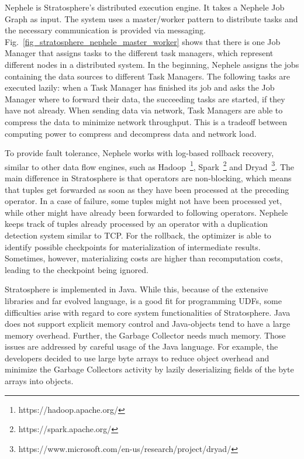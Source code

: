 Nephele is Stratosphere's distributed execution engine. It takes a Nephele Job Graph as input. The system uses a master/worker pattern to distribute tasks and the necessary communication is provided via messaging. Fig.~\ref{fig_stratosphere_nephele_master_worker} shows that there is one Job Manager that assigns tasks to the different task managers, which represent different nodes in a distributed system. In the beginning, Nephele assigns the jobs containing the data sources to different Task Managers. The following tasks are executed lazily: when a Task Manager has finished its job and asks the Job Manager where to forward their data, the succeeding tasks are started, if they have not already. When sending data via network, Task Managers are able to compress the data to minimize network throughput. This is a tradeoff between computing power to compress and decompress data and network load.

To provide fault tolerance, Nephele works with log-based rollback recovery, similar to other data flow engines, such as Hadoop~\footnote{https://hadoop.apache.org/}, Spark~\footnote{https://spark.apache.org/} and Dryad~\footnote{https://www.microsoft.com/en-us/research/project/dryad/}. The main difference in Stratosphere is that operators are non-blocking, which means that tuples get forwarded as soon as they have been processed at the preceding operator. In a case of failure, some tuples might not have been processed yet, while other might have already been forwarded to following operators. Nephele keeps track of tuples already processed by an operator with a duplication detection system similar to TCP. For the rollback, the optimizer is able to identify possible checkpoints for materialization of intermediate results. Sometimes, however, materializing costs are higher than recomputation costs, leading to the checkpoint being ignored.

Stratosphere is implemented in Java. While this, because of the extensive libraries and far evolved language, is a good fit for programming UDFs, some difficulties arise with regard to core system functionalities of Stratosphere. Java does not support explicit memory control and Java-objects tend to have a large memory overhead. Further, the Garbage Collector needs much memory. Those issues are addressed by careful usage of the Java language. For example, the developers decided to use large byte arrays to reduce object overhead and minimize the Garbage Collectors activity by lazily deserializing fields of the byte arrays into objects.

